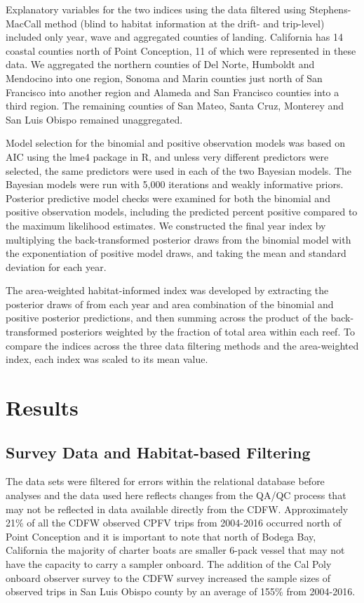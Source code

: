 \documentclass[
  12pt,
  authoryear,
  preprint,
  3p]{elsarticle}
\begin{document}
Explanatory variables for the two indices using the data filtered using
Stephens-MacCall method (blind to habitat information at the drift- and
trip-level) included only year, wave and aggregated counties of landing.
California has 14 coastal counties north of Point Conception, 11 of
which were represented in these data. We aggregated the northern
counties of Del Norte, Humboldt and Mendocino into one region, Sonoma
and Marin counties just north of San Francisco into another region and
Alameda and San Francisco counties into a third region. The remaining
counties of San Mateo, Santa Cruz, Monterey and San Luis Obispo remained
unaggregated.

Model selection for the binomial and positive observation models was
based on AIC using the lme4 package in R, and unless very different
predictors were selected, the same predictors were used in each of the
two Bayesian models. The Bayesian models were run with 5,000 iterations
and weakly informative priors. Posterior predictive model checks were
examined for both the binomial and positive observation models,
including the predicted percent positive compared to the maximum
likelihood estimates. We constructed the final year index by multiplying
the back-transformed posterior draws from the binomial model with the
exponentiation of positive model draws, and taking the mean and standard
deviation for each year.

The area-weighted habitat-informed index was developed by extracting the
posterior draws of from each year and area combination of the binomial
and positive posterior predictions, and then summing across the product
of the back-transformed posteriors weighted by the fraction of total
area within each reef. To compare the indices across the three data
filtering methods and the area-weighted index, each index was scaled to
its mean value.

\hypertarget{results}{%
\section{Results}\label{results}}

\hypertarget{survey-data-and-habitat-based-filtering-1}{%
\subsection{Survey Data and Habitat-based
Filtering}\label{survey-data-and-habitat-based-filtering-1}}

The data sets were filtered for errors within the relational database
before analyses and the data used here reflects changes from the QA/QC
process that may not be reflected in data available directly from the
CDFW. Approximately 21\% of all the CDFW observed CPFV trips from
2004-2016 occurred north of Point Conception and it is important to note
that north of Bodega Bay, California the majority of charter boats are
smaller 6-pack vessel that may not have the capacity to carry a sampler
onboard. The addition of the Cal Poly onboard observer survey to the
CDFW survey increased the sample sizes of observed trips in San Luis
Obispo county by an average of 155\% from 2004-2016.
\end{document}
